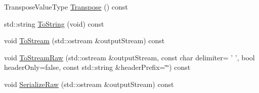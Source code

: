 \begin{DoxyCompactItemize}
Transpose\-Value\-Type \hyperlink{classvct_fixed_size_const_matrix_base_aeae4dddb96b8264169d4aea8ca0479e9}{Transpose} () const 
\item 
std\-::string \hyperlink{classvct_fixed_size_const_matrix_base_adf8dc513147101677b5572201dbb8c4f}{To\-String} (void) const 
\item 
void \hyperlink{classvct_fixed_size_const_matrix_base_a709aa22c92cb589b3bfc75b1fb3eee57}{To\-Stream} (std\-::ostream \&output\-Stream) const 
\item 
void \hyperlink{classvct_fixed_size_const_matrix_base_a615c4bd393d0ff9c177deb3152420862}{To\-Stream\-Raw} (std\-::ostream \&output\-Stream, const char delimiter= ' ', bool header\-Only=false, const std\-::string \&header\-Prefix=\char`\"{}\char`\"{}) const 
\item 
void \hyperlink{classvct_fixed_size_const_matrix_base_a5c91f548566ba05c2e257499dfdb456c}{Serialize\-Raw} (std\-::ostream \&output\-Stream) const 
\end{DoxyCompactItemize}
